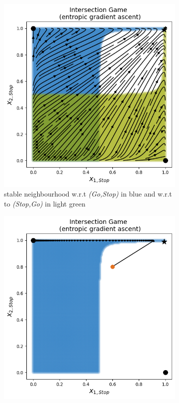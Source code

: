 \begin{figure}[H]
\captionsetup{justification=centering}
\centering
\begin{subfigure}{.5\textwidth}
    \centering
    \includegraphics[width=\textwidth]{logos/Intersection4.png}
    \caption{stable neighbourhood w.r.t \textit{(Go,Stop)} in blue and w.r.t to \textit{(Stop,Go)} in light green}
    \label{fig:IntersectionGame1a}
\end{subfigure}%
\begin{subfigure}{.5\textwidth}
    \centering
    \includegraphics[width=\textwidth]{logos/Intersection5.png}

\end{subfigure}
\end{figure}
